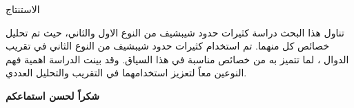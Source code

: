 \begin{frame}{الاستنتاج}
	
	\pause
	تناول هذا البحث دراسة كثيرات حدود شيبشيف من النوع الاول والثاني، حيث تم تحليل خصائص كل منهما. تم استخدام كثيرات حدود شيبشيف من النوع الثاني في تقريب الدوال ، لما تتميز به من خصائص مناسبة في هذا السياق. وقد بينت الدراسة اهمية فهم النوعين معاً لتعزيز استخدامهما في التقريب والتحليل العددي.
\end{frame}

\begin{frame}
	\begin{center}
		\Huge
		\textbf{شكراً لحسن استماعكم}
	\end{center}
\end{frame}

